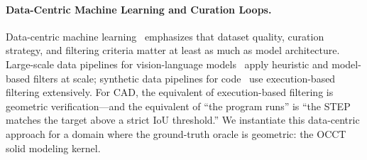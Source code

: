 \paragraph{Data-Centric Machine Learning and Curation Loops.}
Data-centric machine learning~\cite{zha2023datacentric,datacomp} emphasizes that dataset quality, curation strategy, and filtering criteria matter at least as much as model architecture.
Large-scale data pipelines for vision-language models~\cite{datacomp} apply heuristic and model-based filters at scale; synthetic data pipelines for code~\cite{alphacode} use execution-based filtering extensively.
For CAD, the equivalent of execution-based filtering is geometric verification---and the equivalent of ``the program runs'' is ``the STEP matches the target above a strict IoU threshold.''
We instantiate this data-centric approach for a domain where the ground-truth oracle is geometric: the OCCT solid modeling kernel.
